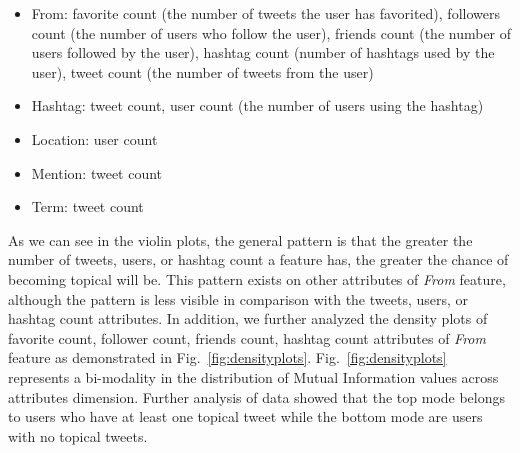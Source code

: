 \begin{itemize}
\item From: favorite count (the number of tweets the user has favorited), followers count (the number of users who follow the user), friends count (the number of users followed by the user), hashtag count (number of hashtags used by the user), tweet count (the number of tweets from the user)
\item Hashtag: tweet count, user count (the number of users using the hashtag)
\item Location: user count
\item Mention: tweet count
\item Term: tweet count
\end{itemize}

As we can see in the violin plots, the general pattern is that the greater the number of tweets, users, or hashtag count a feature has, the greater the chance of becoming topical will be. This pattern exists on other attributes of \textit{From} feature, although the pattern is less visible in comparison with the tweets, users, or hashtag count attributes. 
In addition, we further analyzed the density plots of favorite count, follower count, friends count, hashtag count attributes of \textit{From} feature as demonstrated in Fig.~\ref{fig:densityplots}. Fig.~\ref{fig:densityplots} represents a bi-modality in the distribution of Mutual Information values across attributes dimension. Further analysis of data showed that the top mode belongs to users who have at least one topical tweet while the bottom mode are users with no topical tweets.

